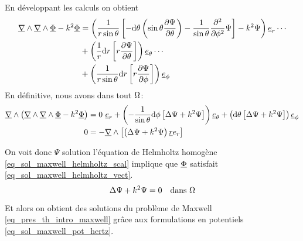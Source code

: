 % 
En développant les calculs on obtient
\begin{align*}
  \underline{\nabla} \wedge \underline{\nabla} \wedge \underline{\Phi} - k^2 \underline{\Phi} 
  &= \left(\dfrac{1}{r\sin\theta}\left[-\mathrm{d}{\theta}\left(\sin\theta\dfrac{\partial \Psi}{\partial \theta}\right)-\dfrac{1}{\sin\theta}\dfrac{\partial^2}{\partial \phi^2}\Psi\right]-k^2\Psi\right)\underline{e}_r \cdots \\
  &+ \left(\dfrac{1}{r}\mathrm{d}{r}\left[r\dfrac{\partial \Psi}{\partial \theta}\right]\right)\underline{e}_\theta \cdots \\
  &+ \left(\dfrac{1}{r\sin\theta}\mathrm{d}{r}\left[r\dfrac{\partial \Psi}{\partial \phi}\right]\right)\underline{e}_\phi
\end{align*}
En définitive, nous avons dans tout $\Omega$:
\begin{align*}
  \rot\left(\rot \rot \v \Phi - k^2 \v \Phi\right) 
  &= %
   0 ~ \v e_r 
  + \left(-\frac{1}{\sin\theta}\dd{\phi}\left[\Delta \Psi + k^2 \Psi \right]\right)\v e_\theta 
  + \left(\dd{\theta}\left[\Delta \Psi + k^2 \Psi \right]\right)\v e_\phi \\
  0 &= -\rot \left[ \left(\Delta \Psi + k^2\Psi\right)\v r e_r\right]
\end{align*}

On voit donc $\Psi$ solution l'équation de Helmholtz homogène  \eqref{eq_sol_maxwell_helmholtz_scal} implique que $\underline{\Phi}$ satisfait \eqref{eq_sol_maxwell_helmholtz_vect}.
\begin{equation}
  \label{eq_sol_maxwell_helmholtz_scal}
   \Delta \Psi + k^2\Psi = 0 \quad \text{dans $\Omega$}
\end{equation}

Et alors on obtient des solutions du problème de Maxwell \eqref{eq_pres_th_intro_maxwell} grâce aux formulations en potentiels \eqref{eq_sol_maxwell_pot_hertz}.
